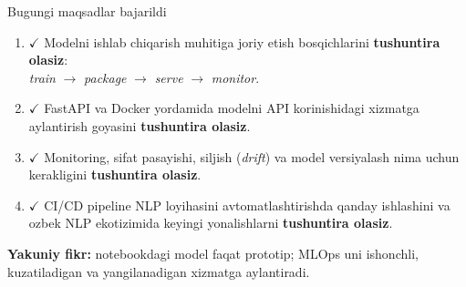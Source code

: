 \documentclass[aspectratio=169,11pt]{beamer}
\newcommand{\bajarildi}{{\color{deepgreen}\large$\checkmark$}\;}
\newcommand{\uzq}{\textquotesingle{}}   %
\begin{document}
\begin{frame}{Bugungi maqsadlar bajarildi}
  \small

  \begin{enumerate}\setlength\itemsep{7pt}
    \item \bajarildi
    Modelni ishlab chiqarish muhitiga joriy etish bosqichlarini
    \textbf{tushuntira olasiz}:\\
    \textit{train} $\to$ \textit{package} $\to$ \textit{serve} $\to$ \textit{monitor}.

    \item \bajarildi
    FastAPI va Docker yordamida modelni API ko\uzq{}rinishidagi xizmatga
    aylantirish g\uzq{}oyasini \textbf{tushuntira olasiz}.

    \item \bajarildi
    Monitoring, sifat pasayishi, siljish (\textit{drift}) va model
    versiyalash nima uchun kerakligini \textbf{tushuntira olasiz}.

    \item \bajarildi
    CI/CD pipeline NLP loyihasini avtomatlashtirishda qanday ishlashini
    va o\uzq{}zbek NLP ekotizimida keyingi yo\uzq{}nalishlarni
    \textbf{tushuntira olasiz}.
  \end{enumerate}

  \vspace{5pt}

  \begin{tcolorbox}[okbox,top=2pt,bottom=2pt,left=4pt,right=4pt]
    \footnotesize
    \textbf{Yakuniy fikr:}
    notebookdagi model faqat prototip; MLOps uni ishonchli, kuzatiladigan
    va yangilanadigan xizmatga aylantiradi.
  \end{tcolorbox}
\end{frame}
\end{document}
